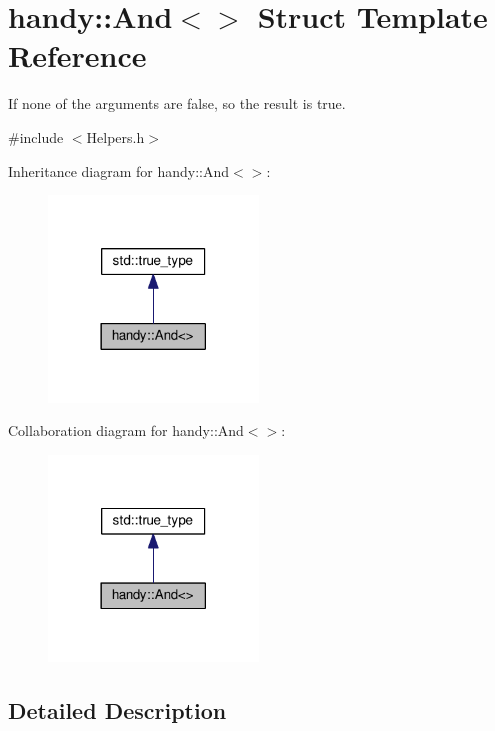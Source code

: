 \hypertarget{structhandy_1_1And_3_4}{}\section{handy\+:\+:And$<$$>$ Struct Template Reference}
\label{structhandy_1_1And_3_4}


If none of the arguments are {\ttfamily false}, so the result is {\ttfamily true}.  




{\ttfamily \#include $<$Helpers.\+h$>$}



Inheritance diagram for handy\+:\+:And$<$$>$\+:\nopagebreak
\begin{figure}[H]
\begin{center}
\leavevmode
\includegraphics[width=158pt]{structhandy_1_1And_3_4__inherit__graph}
\end{center}
\end{figure}


Collaboration diagram for handy\+:\+:And$<$$>$\+:\nopagebreak
\begin{figure}[H]
\begin{center}
\leavevmode
\includegraphics[width=158pt]{structhandy_1_1And_3_4__coll__graph}
\end{center}
\end{figure}


\subsection{Detailed Description}
